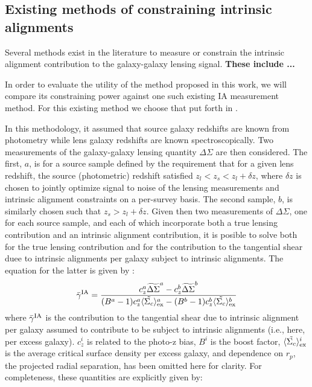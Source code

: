 \documentclass[a4paper,fleqn,usenatbib]{mnras}
\begin{document}
\subsection{Existing methods of constraining intrinsic alignments}
\label{subsec:existing_methods}
\noindent
Several methods exist in the literature to measure or constrain the intrinsic alignment contribution to the galaxy-galaxy lensing signal. {\bf These include ... }

In order to evaluate the utility of the method proposed in this work, we will compare its constraining power against one such existing IA measurement method. For this existing method we choose that put forth in \cite{Blazek2012}. 

In this methodology, it assumed that source galaxy redshifts are known from photometry while lens galaxy redshifts are known spectroscopically. Two measurements of the galaxy-galaxy lensing quantity $\Delta \Sigma$ are then considered. The first, $a$, is for a source sample defined by the requirement that for a given lens redshift, the source (photometric) redshift satisfied $z_l < z_s < z_l + \delta z$, where $\delta z$ is chosen to jointly optimize signal to noise of the lensing measurements and intrinsic alignment constraints on a per-survey basis. The second sample, $b$, is similarly chosen such that $z_s > z_l + \delta z$. Given then two measurements of $\Delta \Sigma$, one for each source sample, and each of which incorporate both a true lensing contribution and an intrinsic alignment contribution, it is posible to solve both for the true lensing contribution and for the contribution to the tangential shear duee to intrinsic alignments per galaxy subject to intrinsic alignments. The equation for the latter is given by \cite{Blazek2012}:
\begin{equation}
\bar{\gamma}^{\rm IA} = \frac{c_z^a \widetilde{\Delta\Sigma}^a - c_z^b \widetilde{\Delta\Sigma}^b}{(B^a-1)c_z^a \langle \tilde{\Sigma_c}\rangle_{\rm ex}^a -(B^b-1)c_z^b \langle \tilde{\Sigma_c}\rangle_{\rm ex}^b}
\label{gammaIA_Blazek}
\end{equation}
where $\bar{\gamma}^{\rm IA}$ is the contribution to the tangential shear due to intrinsic alignment per galaxy assumed to contribute to be subject to intrinsic alignments (i.e., here, per excess galaxy). $c_z^i$ is related to the photo-z bias, $B^i$ is the boost factor, $\langle \tilde{\Sigma_c}\rangle_{\rm ex}^i$ is the average critical surface density per excess galaxy, and dependence on $r_p$, the projected radial separation, has been omitted here for clarity. For completeness, these quantities are explicitly given by:
\end{document}
